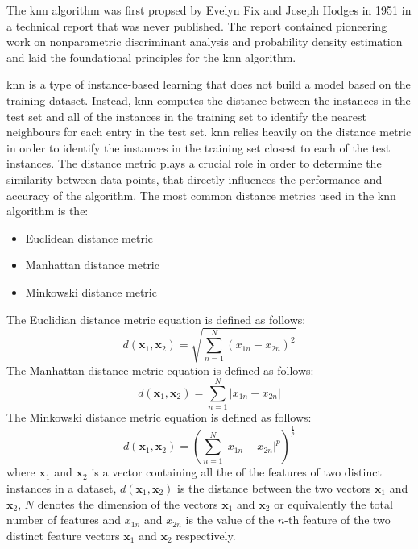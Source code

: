 \documentclass[10pt, conference]{IEEEtran}
\begin{document}
The \acrfull{knn} algorithm was first propsed by Evelyn Fix and Joseph Hodges in 1951 \cite{KNN_ref}
in a technical report that was never published. The report contained pioneering work on nonparametric
discriminant analysis and probability density estimation and laid the foundational principles for
the \acrshort{knn} algorithm.

\acrshort{knn} is a type of instance-based learning that does not build a model based on the training
dataset. Instead, \acrshort{knn} computes the distance between the instances in the test set and all
of the instances in the training set to identify the nearest neighbours for each entry in the test set.
\acrshort{knn} relies heavily on the distance metric in order to identify the instances in the training
set closest to each of the test instances. The distance metric plays a crucial role in order to determine
the similarity between data points, that directly influences the performance and accuracy of the algorithm.
The most common distance metrics used in the \acrshort{knn} algorithm is the:
\begin{itemize}
    \item Euclidean distance metric
    \item Manhattan distance metric
    \item Minkowski distance metric
\end{itemize}

The Euclidian distance metric equation is defined as follows:
\begin{equation}
    d(\boldsymbol{\textbf{x}}_1, \boldsymbol{\textbf{x}}_2) = \sqrt{\sum_{n=1}^{N}(x_{1n} - x_{2n})^2} \label{euclidian}
\end{equation}
The Manhattan distance metric equation is defined as follows:
\begin{equation}
    d(\boldsymbol{\textbf{x}}_1, \boldsymbol{\textbf{x}}_2) = \sum_{n=1}^{N} \left| x_{1n} - x_{2n} \right| \label{manhattan}
\end{equation}
The Minkowski distance metric equation is defined as follows:
\begin{equation}
    d(\boldsymbol{\textbf{x}}_1, \boldsymbol{\textbf{x}}_2) = \left(\sum_{n=1}^{N} \left| x_{1n} - x_{2n} \right|^p\right)^\frac{1}{p} \label{minkowski}
\end{equation}
where $\boldsymbol{\textbf{x}}_1$ and $\boldsymbol{\textbf{x}}_2$ is a vector containing all the of the features of two
distinct instances in a dataset, $d(\boldsymbol{\textbf{x}}_1, \boldsymbol{\textbf{x}}_2)$ is the distance between the two
vectors $\boldsymbol{\textbf{x}}_1$ and $\boldsymbol{\textbf{x}}_2$, $N$ denotes the dimension of the vectors 
$\boldsymbol{\textbf{x}}_1$ and $\boldsymbol{\textbf{x}}_2$ or equivalently the total number of features and $x_{1n}$ and
$x_{2n}$ is the value of the $n$-th feature of the two distinct feature vectors $\boldsymbol{\textbf{x}}_1$ and
$\boldsymbol{\textbf{x}}_2$ respectively.
\end{document}
